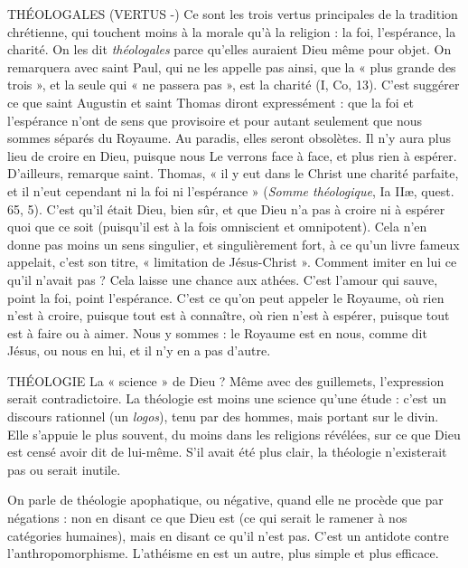 THÉOLOGALES (VERTUS -) Ce sont les trois vertus principales de la tradition
chrétienne, qui touchent moins à la
morale qu’à la religion : la foi, l'espérance, la charité. On les dit {\it théologales}
parce qu’elles auraient Dieu même pour objet. On remarquera avec saint Paul,
qui ne les appelle pas ainsi, que la « plus grande des trois », et la seule qui « ne
passera pas », est la charité (I, Co, 13). C’est suggérer ce que saint Augustin et
saint Thomas diront expressément : que la foi et l'espérance n’ont de sens que
provisoire et pour autant seulement que nous sommes séparés du Royaume. Au
paradis, elles seront obsolètes. Il n’y aura plus lieu de croire en Dieu, puisque
nous Le verrons face à face, et plus rien à espérer. D'ailleurs, remarque saint.
Thomas, « il y eut dans le Christ une charité parfaite, et il n’eut cependant ni
la foi ni l'espérance » ({\it Somme théologique}, Ia IIæ, quest. 65, 5). C’est qu’il était
Dieu, bien sûr, et que Dieu n’a pas à croire ni à espérer quoi que ce soit
(puisqu'il est à la fois omniscient et omnipotent). Cela n’en donne pas moins
un sens singulier, et singulièrement fort, à ce qu’un livre fameux appelait, c’est
son titre, « limitation de Jésus-Christ ». Comment imiter en lui ce qu’il n’avait
pas ? Cela laisse une chance aux athées. C’est l’amour qui sauve, point la foi,
point l'espérance. C’est ce qu’on peut appeler le Royaume, où rien n’est à
croire, puisque tout est à connaître, où rien n’est à espérer, puisque tout est à
faire ou à aimer. Nous y sommes : le Royaume est en nous, comme dit Jésus,
ou nous en lui, et il n’y en a pas d’autre.

THÉOLOGIE La « science » de Dieu ? Même avec des guillemets, l’expression
serait contradictoire. La théologie est moins une science
qu'une étude : c’est un discours rationnel (un {\it logos}), tenu par des hommes,
mais portant sur le divin. Elle s’appuie le plus souvent, du moins dans les religions
révélées, sur ce que Dieu est censé avoir dit de lui-même. S'il avait été
plus clair, la théologie n’existerait pas ou serait inutile.

On parle de théologie apophatique, ou négative, quand elle ne procède
que par négations : non en disant ce que Dieu est (ce qui serait le ramener à
nos catégories humaines), mais en disant ce qu’il n’est pas. C’est un antidote
contre l’anthropomorphisme. L’athéisme en est un autre, plus simple et plus
efficace.

